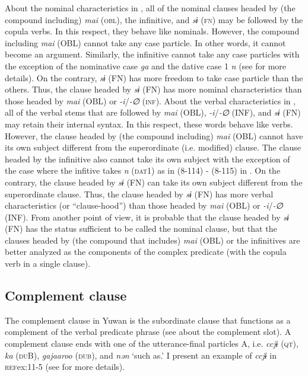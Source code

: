 About the nominal characteristics in , all of the nominal clauses headed by (the compound including) \textit{mai} (\textsc{obl}), the infinitive, and \textit{sɨ} (\textsc{fn}) may be followed by the copula verbs. In this respect, they behave like nominals. However, the compound including \textit{mai} (OBL) cannot take any case particle. In other words, it cannot become an argument. Similarly, the infinitive cannot take any case particles with the exception of the nominative case \textit{ga} and the dative case 1 \textit{n} (see  for more details). On the contrary, \textit{sɨ} (FN) has more freedom to take case particle than the others. Thus, the clause headed by \textit{sɨ} (FN) has more nominal characteristics than those headed by \textit{mai} (OBL) or \textit{{}-i}/\textit{{}-∅} (\textsc{inf}). About the verbal characteristics in , all of the verbal stems that are followed by \textit{mai} (OBL), \textit{{}-i}/\textit{{}-∅} (INF), and \textit{sɨ} (FN) may retain their internal syntax. In this respect, these words behave like verbs. However, the clause headed by (the compound including) \textit{mai} (OBL) cannot have its own subject different from the superordinate (i.e. modified) clause. The clause headed by the infinitive also cannot take its own subject with the exception of the case where the infitive takes \textit{n} (\textsc{dat}1) as in (8-114) - (8-115) in . On the contrary, the clause headed by \textit{sɨ} (FN) can take its own subject different from the superordinate clause. Thus, the clause headed by \textit{sɨ} (FN) has more verbal characteristics (or “clause-hood”) than those headed by \textit{mai} (OBL) or \textit{{}-i}/\textit{{}-∅} (INF). From another point of view, it is probable that the clause headed by \textit{sɨ} (FN) has the status sufficient to be called the nominal clause, but that the clauses headed by (the compound that includes) \textit{mai} (OBL) or the infinitives are better analyzed as the components of the complex predicate (with the copula verb in a single clause).

\subsection{Complement clause}\label{sec:11.1.4}

The complement clause in Yuwan is the subordinate clause that functions as a complement of the verbal predicate phrase (see  about the complement slot). A complement clause ends with one of the utterance-final particles A, i.e. \textit{ccjɨ} (\textsc{qt}), \textit{ka} (\textsc{du}B), \textit{gajaaroo} (\textsc{dub}), and \textit{nən} ‘such as.’ I present an example of \textit{ccjɨ} in \textsc{ref}{ex:11-5} (see  for more details).

